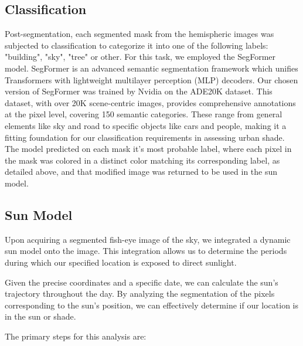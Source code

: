 \documentclass[nohyperref]{article}
\theoremstyle{plain}
\theoremstyle{definition}
\theoremstyle{remark}
\begin{document}
\subsection{Classification}
Post-segmentation, each segmented mask from the hemispheric images was subjected to classification to categorize it into one of the following labels: "building", "sky", "tree" or other. For this task, we employed the SegFormer model. SegFormer is an advanced semantic segmentation framework which unifies Transformers with lightweight multilayer perception (MLP) decoders. Our chosen version of SegFormer was trained by Nvidia on the ADE20K dataset. This dataset, with over 20K scene-centric images, provides comprehensive annotations at the pixel level, covering 150 semantic categories. These range from general elements like sky and road to specific objects like cars and people, making it a fitting foundation for our classification requirements in assessing urban shade. The model predicted on each mask it's most probable label, where each pixel in the mask was colored in a distinct color matching its corresponding label, as detailed above, and that modified image was returned to be used in the sun model.

\subsection{Sun Model}
Upon acquiring a segmented fish-eye image of the sky, we integrated a dynamic sun model onto the image. This integration allows us to determine the periods during which our specified location is exposed to direct sunlight.

Given the precise coordinates and a specific date, we can calculate the sun's trajectory throughout the day. By analyzing the segmentation of the pixels corresponding to the sun's position, we can effectively determine if our location is in the sun or shade.

The primary steps for this analysis are:
\end{document}

